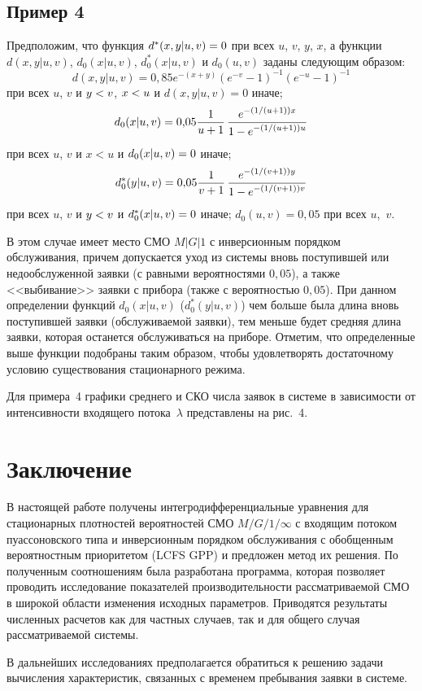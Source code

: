 \begin{multicols}{2}
\subsection{Пример 4}


 Предположим, что функция $d^*(x,y|u,v)\hm=0$
при всех $u$, $v$, $y$, $x$, а функции
$d(x,y|u,v)$, $d_0(x|u,v)$, $d_0^*(x|u,v)$
и $d_0(u,v)$ заданы следующим образом:
$$
d(x,y|u,v)=0{,}85 e^{-(x+y)}
(e^{- v}-1)^{-1}(e^{- u}-1)^{-1}
$$
при всех $u$, $v$ и $y\hm<v$, $x\hm<u$
и $d(x,y|u,v)=0$ иначе;
$$
d_0(x|u,v)=0{,}05\displaystyle\frac{\displaystyle 1\mathstrut}{\displaystyle u+1\mathstrut}\, \displaystyle\frac{\displaystyle  e^{-(1/(u+1))x}\mathstrut}{\displaystyle 
1-e^{-(1/(u+1))u}\mathstrut}
$$
при всех $u$, $v$ и $x<u$ и $d_0(x|u,v)\hm=0$
иначе;
$$
d_0^*(y|u,v)=0{,}05\displaystyle\frac{\displaystyle 1\mathstrut}{\displaystyle v+1 \mathstrut}\,
\displaystyle\frac{\displaystyle e^{-(1/(v+1))y} \mathstrut}{\displaystyle 1-e^{{-(1/(v+1))}v}\mathstrut}
$$
при всех $u$, $v$ и $y\hm<v$ и $d_0^*(x|u,v)\hm=0$
иначе;
$d_0(u,v)=0{,}05$ при всех $u$,~$v$.

В этом случае имеет место СМО $M|G|1$ с
инверсионным порядком обслуживания, причем
допускается уход из системы вновь
поступившей или недообслуженной заявки (с равными вероятностями $0{,}05$),
а также <<выбивание>>  заявки с прибора
(также с вероятностью $0{,}05$). При данном определении функций $d_0(x|u,v)$
($d_0^*(y|u,v)$) чем больше была длина вновь
поступившей заявки (обслуживаемой заявки),
тем меньше будет средняя длина заявки, которая
останется обслуживаться на приборе.
Отметим, что определенные выше функции
подобраны таким образом, чтобы
удовлетворять достаточному условию существования
стационарного режима.

Для примера~4 графики среднего и СКО числа заявок
в системе в зависимости от интенсивности входящего потока~$\lambda$ представлены на
рис.~4.

\section{Заключение}

 В настоящей работе получены интегродифференциальные уравнения
для стационарных плотностей вероятностей СМО $M/G/1/\infty$ с входящим потоком
пуассоновского типа и инверсионным порядком обслуживания с обобщенным вероятностным
приоритетом ({LCFS GPP}) и предложен метод их решения.
 По полученным соотношениям была разработана программа, которая позволяет проводить исследование
показателей про\-из\-во\-ди\-тель\-ности рассматриваемой
СМО в широкой области изменения исходных параметров.
 Приводятся результаты численных расчетов как
для частных случаев, так и для общего случая рассматриваемой системы.

В дальнейших исследованиях предполагается
обратиться к решению задачи вычисления характеристик,
связанных с временем пребывания заявки в системе.


\end{multicols}
